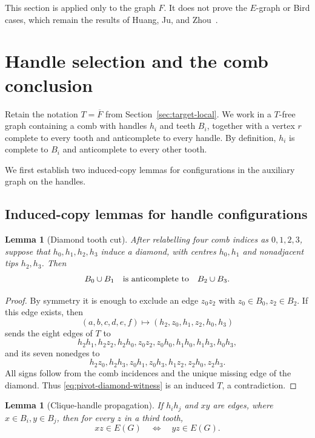 \documentclass[11pt]{article}
\numberwithin{equation}{section}
\theoremstyle{plain}
\newtheorem{lemma}[theorem]{Lemma}
\theoremstyle{definition}
\begin{document}
This section is applied only to the graph $F$.  It does not prove the
$E$-graph or Bird cases, which remain the results of Huang, Ju, and
Zhou~\cite{HuangJuZhou2026}.

\section{Handle selection and the comb conclusion}
\label{sec:main-comb}

Retain the notation $T=\overline F$ from
Section~\ref{sec:target-local}.
We work in a $T$-free graph containing a comb with handles $h_i$ and
teeth $B_i$, together with a vertex $r$ complete to every tooth and
anticomplete to every handle.  By definition, $h_i$ is complete to $B_i$
and anticomplete to every other tooth.

We first establish two induced-copy lemmas for configurations in the
auxiliary graph on the handles.

\subsection{Induced-copy lemmas for handle configurations}

\begin{lemma}[Diamond tooth cut]
\label{lem:pivot-diamond-cut}
After relabelling four comb indices as $0,1,2,3$, suppose that
$h_0,h_1,h_2,h_3$ induce a diamond, with centres
$h_0,h_1$ and nonadjacent tips $h_2,h_3$.  Then
\[
                   B_0\cup B_1
       \quad\hbox{is anticomplete to}\quad
                   B_2\cup B_3.
\]
\end{lemma}

\begin{proof}
By symmetry it is enough to exclude an edge $z_0z_2$ with
$z_0\in B_0,z_2\in B_2$.  If this edge exists, then
\begin{equation}
 (a,b,c,d,e,f)\longmapsto(h_2,z_0,h_1,z_2,h_0,h_3)
 \label{eq:pivot-diamond-witness}
\end{equation}
sends the eight edges of $T$ to
\[
 h_2h_1,h_2z_2,h_2h_0,z_0z_2,z_0h_0,
 h_1h_0,h_1h_3,h_0h_3,
\]
and its seven nonedges to
\[
 h_2z_0,h_2h_3,z_0h_1,z_0h_3,h_1z_2,z_2h_0,z_2h_3.
\]
All signs follow from the comb incidences and the unique missing edge
of the diamond.  Thus \eqref{eq:pivot-diamond-witness} is an induced
$T$, a contradiction.
\end{proof}

\begin{lemma}[Clique-handle propagation]
\label{lem:pivot-clique-propagation}
If $h_ih_j$ and $xy$ are edges, where $x\in B_i,y\in B_j$, then for
every $z$ in a third tooth,
\begin{equation}
                         xz\in E(G)\quad\Longleftrightarrow\quad
                         yz\in E(G).
 \label{eq:pivot-clique-propagation}
\end{equation}
\end{lemma}
\end{document}
